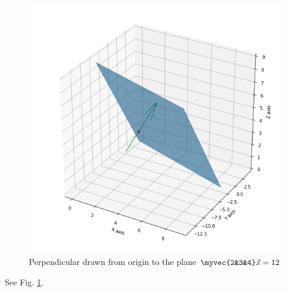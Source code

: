 \begin{figure}[h!]
    \centering
    \includegraphics[width=\columnwidth]{./solutions/line_plane/83/plane1.png}
    \caption{Perpendicular drawn from origin to the plane $\myvec{2&3&4}\vec{x} = 12$}
    \label{myfig:solutions/line_plane/83}
\end{figure}
See Fig. \ref{myfig:solutions/line_plane/83}.
